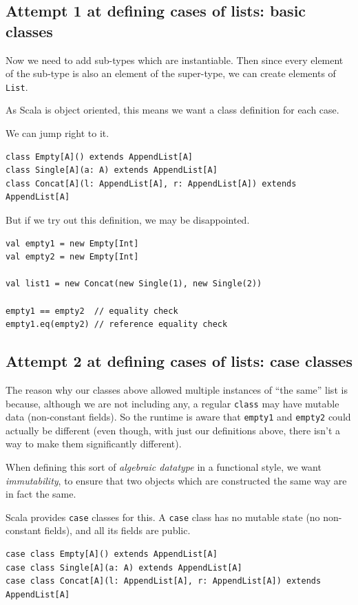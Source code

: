 \documentclass[11pt]{article}
\begin{document}
\subsection{Attempt 1 at defining cases of lists: basic classes}
\label{sec:orgaad6acd}
Now we need to add sub-types which are instantiable.
Then since every element of the sub-type is also an element
of the super-type, we can create elements of \texttt{List}.

As Scala is object oriented, this means we want
a class definition for each case.

We can jump right to it.
\begin{verbatim}
class Empty[A]() extends AppendList[A]
class Single[A](a: A) extends AppendList[A]
class Concat[A](l: AppendList[A], r: AppendList[A]) extends AppendList[A]
\end{verbatim}

But if we try out this definition, we may be disappointed.
\begin{verbatim}
val empty1 = new Empty[Int]
val empty2 = new Empty[Int]

val list1 = new Concat(new Single(1), new Single(2))

empty1 == empty2  // equality check
empty1.eq(empty2) // reference equality check
\end{verbatim}

\subsection{Attempt 2 at defining cases of lists: case classes}
\label{sec:orga23a99c}
The reason why our classes above allowed multiple instances
of “the same” list is because, although we are not including any,
a regular \texttt{class} may have mutable data (non-constant fields).
So the runtime is aware that \texttt{empty1} and \texttt{empty2} could
actually be different (even though, with just our definitions above,
there isn't a way to make them significantly different).

When defining this sort of \emph{algebraic datatype} in a
functional style, we want \emph{immutability}, to ensure that
two objects which are constructed the same way
are in fact the same.

Scala provides \texttt{case} classes for this.
A \texttt{case} class has no mutable state (no non-constant fields),
and all its fields are public.
\begin{verbatim}
case class Empty[A]() extends AppendList[A]
case class Single[A](a: A) extends AppendList[A]
case class Concat[A](l: AppendList[A], r: AppendList[A]) extends AppendList[A]
\end{verbatim}
\end{document}
